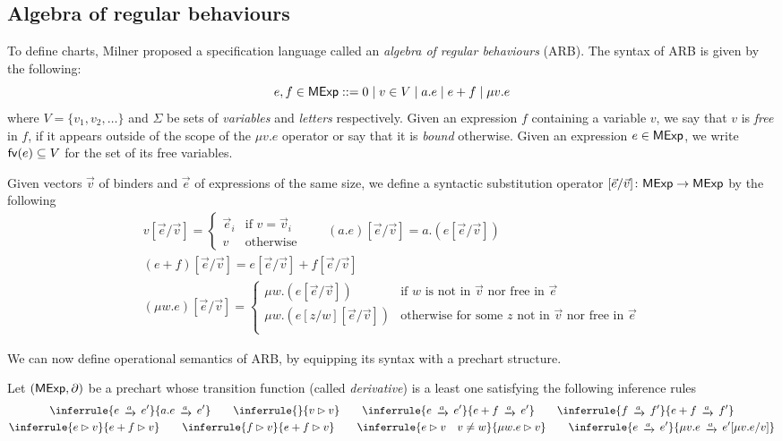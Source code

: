 \subsection{Algebra of regular behaviours}
To define charts, Milner proposed a specification language called an \emph{algebra of regular behaviours} (ARB). The syntax of ARB is given by the following:
$$e,f \in \mathsf{MExp} ::= 0 \mid v \in V \mid a.e \mid e + f \mid \mu v. e$$
where $V=\{v_1, v_2, \dots\}$ and $\Sigma$ be sets of \emph{variables} and \emph{letters} respectively. Given an expression $f$ containing a variable $v$, we say that $v$ is \emph{free} in $f$, if it appears outside of the scope of the $\mu v.e$ operator or say that it is \emph{bound} otherwise. Given an expression $e \in \mathsf{MExp}$, we write $\mathsf{fv}(e) \subseteq V$ for the set of its free variables. 
\begin{definition}\label{def:subset}
	Given vectors $\vec{v}$ of binders and $\vec{e}$ of expressions of the same size, we define a syntactic substitution operator $[\vec{e}/\vec{v}] \colon \mathsf{MExp} \to \mathsf{MExp}$ by the following
	\begin{gather*}
		v[\vec{e}/\vec{v}] = \begin{cases}
			\vec{e}_i & \text{if }v=\vec{v}_i\\
			v & \text{otherwise}
		\end{cases}
		\qquad
		(a.e)[\vec{e}/\vec{v}] = a.(e[\vec{e}/\vec{v}])\\
		(e + f)[\vec{e}/\vec{v}] = e[\vec{e}/\vec{v}] + f[\vec{e}/\vec{v}]\\
		(\mu w.e)[\vec{e}/\vec{v}] = \begin{cases}
			\mu w. (e[\vec{e}/\vec{v}]) & \text{if } w \text{ is not in } \vec{v} \text{ nor free in } \vec{e}\\
			\mu w. (e[z/w][\vec{e}/\vec{v}]) & \text{otherwise for some } z \text{ not in } \vec{v} \text{ nor free in } \vec{e}\\
		\end{cases}
	\end{gather*}
\end{definition}
We can now define operational semantics of ARB, by equipping its syntax with a prechart structure.
\begin{definition}\label{def:operational_semantics}
	Let $(\mathsf{MExp}, \partial)$ be a prechart whose transition function (called \emph{derivative}) is a least one satisfying the following inference rules
	\begin{gather*}
		\inferrule{e \tr{a} e' }{a.e \tr{a} e'} \qquad \inferrule{ }{v \rhd v} \qquad \inferrule{e \tr{a} e'}{e + f \tr{a} e'} \qquad \inferrule{f \tr{a} f'}{e + f \tr{a} f'}\\
		\inferrule {e \rhd v}{e + f \rhd v} \qquad \inferrule {f \rhd v}{e + f \rhd v} \qquad \inferrule{e \rhd v\quad v \neq w}{\mu w.e \rhd v } \qquad \inferrule{e \tr{a} e'}{\mu v. e \tr{a} e'[\mu v .e / v]}
	\end{gather*}
\end{definition}
